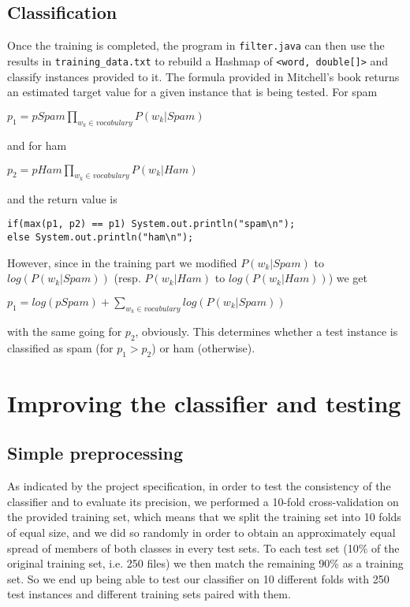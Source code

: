 \documentclass[12pt,a4paper]{report}
\begin{document}
\subsection{Classification}
Once the training is completed, the program in \texttt{filter.java} can then use the results in \texttt{training\_data.txt} to rebuild a Hashmap of \texttt{<word, double[]>} and classify instances provided to it. The formula provided in Mitchell's book returns an estimated target value for a given instance that is being tested. For spam
\begin{center}
$ p_1 = pSpam\prod\limits_{w_k \in vocabulary}P(w_k|Spam)$
\end{center} 
and for ham
\begin{center}
$ p_2 = pHam\prod\limits_{w_k \in vocabulary}P(w_k|Ham)$
\end{center} 
and the return value is 
\begin{lstlisting}
if(max(p1, p2) == p1) System.out.println("spam\n");
else System.out.println("ham\n");
\end{lstlisting}
However, since in the training part we modified $P(w_k|Spam)$ to $log(P(w_k|Spam))$ (resp. $P(w_k|Ham)$ to $log(P(w_k|Ham))$) we get 
\begin{center}
$ p_1 = log(pSpam) + \sum\limits_{w_k \in vocabulary}log(P(w_k|Spam))$
\end{center}
with the same going for $p_2$, obviously. This determines whether a test instance is classified as spam (for $p_1 > p_2$) or ham (otherwise).

\section{Improving the classifier and testing}
\subsection{Simple preprocessing}
As indicated by the project specification, in order to test the consistency of the classifier and to evaluate its precision, we performed a 10-fold cross-validation on the provided training set, which means that we split the training set into 10 folds of equal size, and we did so randomly in order to obtain an approximately equal spread of members of both classes in every test sets. To each test set (10\% of the original training set, i.e. 250 files) we then match the remaining 90\% as a training set. So we end up being able to test our classifier on 10 different folds with 250 test instances and different training sets paired with them.
\end{document}
